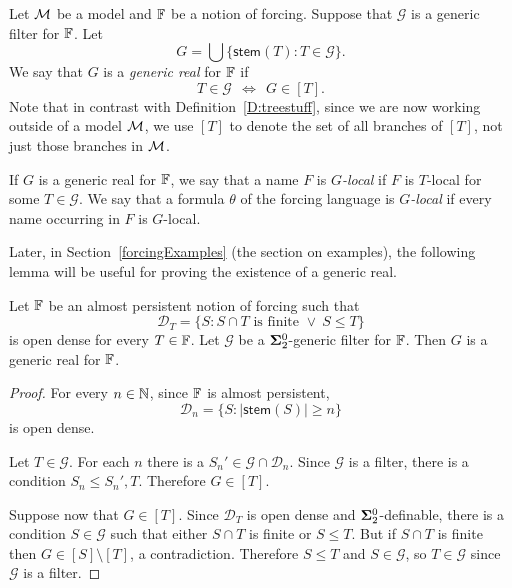 \begin{definition}
Let $\mathcal{M}$ be a model and $\mathbb{F}$ be a notion of forcing.
Suppose that $\mathcal{G}$ is a generic filter for $\mathbb{F}$.
Let
$$G=\bigcup\Big\{\mathsf{stem}(T):T\in\mathcal{G}\Big\}.$$
We say that $G$ is a \textit{generic real} for $\mathbb{F}$ if
$$T\in\mathcal{G}\ \ \Leftrightarrow\ \ G\in[T].$$
Note that in contrast with Definition~\ref{D:treestuff},
since we are now working outside of a model $\mathcal{M}$,
we use $[T]$ to denote the set of all branches of $[T]$,
not just those branches in $\mathcal{M}$.

If $G$ is a generic real for $\mathbb{F}$,
we say that a name $F$ is $G$\textit{-local} if $F$ is $T$-local
for some $T\in\mathcal{G}$.
We say that a formula $\theta$ of the forcing language is $G$\textit{-local}
if every name occurring in $F$ is $G$-local.
\end{definition}

Later, in Section~\ref{forcingExamples} (the section on examples),
the following lemma will be useful for proving the existence of a generic real.

\begin{lem}\label{L:Gen:realForc}
Let $\mathbb{F}$ be an almost persistent notion of forcing such that
$$\mathcal{D}_T=\{S:S\cap T\text{ is finite }\lor\ S\leq T\}$$
is open dense for every $T\in\mathbb{F}$.
Let $\mathcal{G}$ be a $\mathbf{\Sigma}^0_2$-generic filter for $\mathbb{F}$.
Then $G$ is a generic real for $\mathbb{F}$.
\end{lem}

\begin{proof}
For every $n\in\mathbb{N}$, since $\mathbb{F}$ is almost persistent,
$$\mathcal{D}_n=\{S:|\mathsf{stem}(S)|\geq n\}$$
is open dense.

Let $T\in\mathcal{G}$.
For each $n$ there is a $S_n'\in\mathcal{G}\cap\mathcal{D}_n$.
Since $\mathcal{G}$ is a filter, there is a condition $S_n\leq S_n',T$.
Therefore $G\in[T]$.

Suppose now that $G\in[T]$.
Since $\mathcal{D}_T$ is open dense and $\mathbf{\Sigma}^0_2$-definable,
there is a condition $S\in\mathcal{G}$ such that
either $S\cap T$ is finite or $S\leq T$.
But if $S\cap T$ is finite then $G\in[S]\setminus[T]$, a contradiction.
Therefore $S\leq T$ and $S\in\mathcal{G}$, so $T\in\mathcal{G}$ since
$\mathcal{G}$ is a filter.
\end{proof}


